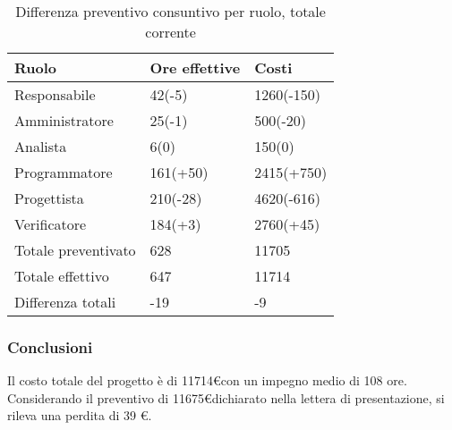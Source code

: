 		
	\begin{table}[H]
		\centering
	  \begin{tabular}{p{}p{}
		    							p{}}
		   \toprule Ruolo & Ore effettive & Costi \\
		   \midrule
			  Responsabile & 42(-5)  & 1260(-150) \\
			  Amministratore & 25(-1) & 500(-20) \\
			  Analista & 6(0) & 150(0) \\
			  Programmatore & 161(+50)  & 2415(+750) \\
			  Progettista & 210(-28)  & 4620(-616) \\
			  Verificatore & 184(+3)  & 2760(+45) \\
			  \hline
			  Totale preventivato & 628  & 11705 \\
			
			  Totale effettivo & 647  & 11714 \\
		
			  Differenza totali & -19  & -9 \\
			  \bottomrule
			 \end{tabular}
			 \label{tab:diffcostorendicontato}
			 \caption{Differenza preventivo consuntivo per ruolo, totale corrente}
			\end{table}
			
\subsubsection{Conclusioni}
Il costo totale del progetto è di 11714\euro con un impegno medio di 108 ore. Considerando il preventivo di 11675\euro dichiarato nella lettera di presentazione, si rileva una perdita di 39 €.		